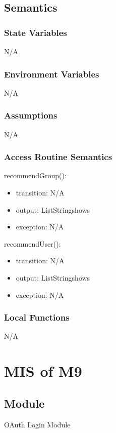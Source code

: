 \documentclass[12pt, titlepage]{article}
\begin{document}
\subsection{Semantics}

\subsubsection{State Variables}
N/A

\subsubsection{Environment Variables}
N/A

\subsubsection{Assumptions}
N/A

\subsubsection{Access Routine Semantics}

\noindent recommendGroup():
\begin{itemize}
\item transition: N/A
\item output: List\textlangle String\textrangle shows
\item exception: N/A
\end{itemize}

\noindent recommendUser():
\begin{itemize}
\item transition: N/A
\item output: List\textlangle String\textrangle shows
\item exception: N/A
\end{itemize}

\subsubsection{Local Functions}
N/A


\section{MIS of M9} \label{Module}

\subsection{Module}
OAuth Login Module
\end{document}
